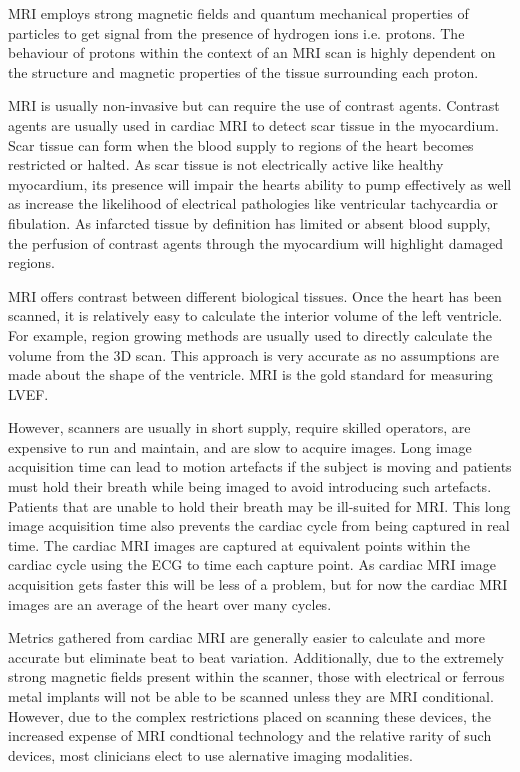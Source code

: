 \documentclass[12pt]{article}
\begin{document}
MRI employs strong magnetic fields and quantum mechanical properties of particles to get signal from the presence of hydrogen ions i.e. protons.
The behaviour of protons within the context of an MRI scan is highly dependent on the structure and magnetic properties of the tissue surrounding each proton.
\par
MRI is usually non-invasive but can require the use of contrast agents.
Contrast agents are usually used in cardiac MRI to detect scar tissue in the myocardium.
Scar tissue  can form when the blood supply to regions of the heart becomes restricted or halted.
As scar tissue is not electrically active like healthy myocardium, its presence will impair the hearts ability to pump effectively as well as increase the likelihood of electrical pathologies like ventricular tachycardia or fibulation.
As infarcted tissue by definition has limited or absent blood supply, the perfusion of contrast agents through the myocardium will highlight damaged regions.
\par 
MRI offers contrast between different biological tissues.
Once the heart has been scanned, it is relatively easy to calculate the interior volume of the left ventricle.
For example, region growing methods are usually used  to directly calculate the volume from the 3D scan.
This approach is very accurate as no assumptions are made about the shape of the ventricle.
MRI is the gold standard for measuring LVEF. 

However, scanners are usually in short supply, require skilled operators, are expensive to run and maintain, and are slow to acquire images.
Long image acquisition time can lead to motion artefacts if the subject is moving and 
patients must hold their breath while being imaged to avoid introducing such artefacts.
Patients that are unable to hold their breath may be ill-suited for MRI.
This long image acquisition time also prevents the cardiac cycle from being captured in real time.
The cardiac MRI images are captured at equivalent points within the cardiac cycle using the ECG to time each capture point.
As cardiac MRI image acquisition gets faster this will be less of a problem, but for now the cardiac MRI images are an average of the heart over many cycles.
\par 
Metrics gathered from cardiac MRI are generally easier to calculate and more accurate but eliminate beat to beat variation.
Additionally, due to the extremely strong magnetic fields present within the scanner, those with electrical or ferrous metal implants will not be able to be scanned unless they are MRI conditional. 
However, due to the complex restrictions placed on scanning these devices, the increased expense of MRI condtional technology and the relative rarity of such devices, most clinicians elect to use alernative imaging modalities.\cite{mri_implants}
\end{document}
